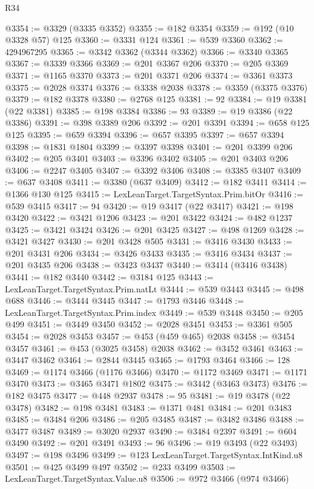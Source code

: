 \begin{lexlean}{R34}
\begin{coremodule}
@3354 := @3329 (@3335 @3352)
@3355 := @182 @3354
@3359 := @192 (@10 @3328 @57) @125
@3360 := @3331 @124
@3361 := @539 @3360
@3362 := 4294967295
@3365 := @3342 @3362 (@3344 @3362)
@3366 := @3340 @3365
@3367 := @3339 @3366
@3369 := @201 @3367 @206
@3370 := @205 @3369
@3371 := @1165 @3370
@3373 := @201 @3371 @206
@3374 := @3361 @3373
@3375 := @2028 @3374
@3376 := @3338 @2038
@3378 := @3359 (@3375 @3376)
@3379 := @182 @3378
@3380 := @2768 @125
@3381 := 92
@3384 := @19 @3381 (@22 @3381)
@3385 := @198 @3384
@3386 := 93
@3389 := @19 @3386 (@22 @3386)
@3391 := @398 @3389 @206
@3392 := @201 @3391
@3394 := @658 @125 @125
@3395 := @659 @3394
@3396 := @657 @3395
@3397 := @657 @3394
@3398 := @1831 @1804
@3399 := @3397 @3398
@3401 := @201 @3399 @206
@3402 := @205 @3401
@3403 := @3396 @3402
@3405 := @201 @3403 @206
@3406 := @2247 @3405
@3407 := @3392 @3406
@3408 := @3385 @3407
@3409 := @637 @3408
@3411 := @3380 (@637 @3409)
@3412 := @182 @3411
@3414 := @1366 @130 @125
@3415 := LexLeanTarget.TargetSyntax.Prim.bitOr
@3416 := @539 @3415
@3417 := 94
@3420 := @19 @3417 (@22 @3417)
@3421 := @198 @3420
@3422 := @3421 @1206
@3423 := @201 @3422
@3424 := @482 @1237
@3425 := @3421 @3424
@3426 := @201 @3425
@3427 := @498 @1269
@3428 := @3421 @3427
@3430 := @201 @3428 @505
@3431 := @3416 @3430
@3433 := @201 @3431 @206
@3434 := @3426 @3433
@3435 := @3416 @3434
@3437 := @201 @3435 @206
@3438 := @3423 @3437
@3440 := @3414 (@3416 @3438)
@3441 := @182 @3440
@3442 := @3184 @125
@3443 := LexLeanTarget.TargetSyntax.Prim.natLt
@3444 := @539 @3443
@3445 := @498 @688
@3446 := @3444 @3445
@3447 := @1793 @3446
@3448 := LexLeanTarget.TargetSyntax.Prim.index
@3449 := @539 @3448
@3450 := @205 @499
@3451 := @3449 @3450
@3452 := @2028 @3451
@3453 := @3361 @505
@3454 := @2028 @3453
@3457 := @453 (@459 @465) @2038
@3458 := @3454 @3457
@3461 := @453 (@3025 @3458) @2038
@3462 := @3452 @3461
@3463 := @3447 @3462
@3464 := @2844 @3445
@3465 := @1793 @3464
@3466 := 128
@3469 := @1174 @3466 (@1176 @3466)
@3470 := @1172 @3469
@3471 := @1171 @3470
@3473 := @3465 @3471 @1802
@3475 := @3442 (@3463 @3473)
@3476 := @182 @3475
@3477 := @448 @2937
@3478 := 95
@3481 := @19 @3478 (@22 @3478)
@3482 := @198 @3481
@3483 := @1371 @481
@3484 := @201 @3483
@3485 := @3484 @206
@3486 := @205 @3485
@3487 := @3482 @3486
@3488 := @3477 @3487
@3489 := @3020 @2937
@3490 := @3484 @2397
@3491 := @604 @3490
@3492 := @201 @3491
@3493 := 96
@3496 := @19 @3493 (@22 @3493)
@3497 := @198 @3496
@3499 := @123 LexLeanTarget.TargetSyntax.IntKind.u8
@3501 := @425 @3499 @497
@3502 := @233 @3499
@3503 := LexLeanTarget.TargetSyntax.Value.u8
@3506 := @972 @3466 (@974 @3466)

\end{coremodule}
\end{lexlean}
